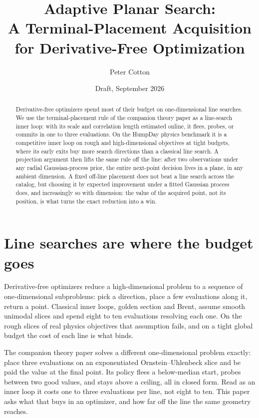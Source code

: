 \documentclass[11pt]{article}
\title{Adaptive Planar Search:\\[4pt]
{\large A Terminal-Placement Acquisition for Derivative-Free Optimization}}
\author{Peter Cotton}
\date{Draft, September 2026}
\theoremstyle{itheads}
\begin{document}
\maketitle

\begin{abstract}
\noindent Derivative-free optimizers spend most of their budget on
one-dimensional line searches. We use the terminal-placement rule of
the companion theory paper as a line-search inner loop: with its scale
and correlation length estimated online, it flees, probes, or commits
in one to three evaluations. On the HumpDay physics benchmark it is a
competitive inner loop on rough and high-dimensional objectives at
tight budgets, where its early exits buy more search directions than a
classical line search. A projection argument then lifts the same rule
off the line: after two observations under any radial Gaussian-process
prior, the entire next-point decision lives in a plane, in any ambient
dimension. A fixed off-line placement does not beat a line search
across the catalog, but choosing it by expected improvement under a
fitted Gaussian process does, and increasingly so with dimension: the
value of the acquired point, not its position, is what turns the exact
reduction into a win.
\end{abstract}

\section{Line searches are where the budget goes}

Derivative-free optimizers reduce a high-dimensional problem to a
sequence of one-dimensional subproblems: pick a direction, place a few
evaluations along it, return a point. Classical inner loops, golden
section and Brent, assume smooth unimodal slices and spend eight to ten
evaluations resolving each one. On the rough slices of real physics
objectives that assumption fails, and on a tight global budget the cost
of each line is what binds.

The companion theory paper solves a different one-dimensional problem
exactly: place three evaluations on an exponentiated Ornstein--Uhlenbeck
slice and be paid the value at the final point. Its policy flees a
below-median start, probes between two good values, and stays above a
ceiling, all in closed form. Read as an inner loop it costs one to
three evaluations per line, not eight to ten. This paper asks what that
buys in an optimizer, and how far off the line the same geometry
reaches.
\end{document}
